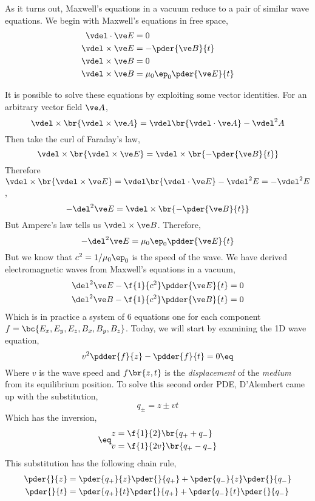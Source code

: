 \documentclass{article}
\begin{document}
As it turns out, Maxwell's equations in a vacuum reduce to a pair of similar wave equations. We begin with Maxwell's equations in free space,
\begin{align*}
    \vdel \cdot \ve E &= 0 \\
    \vdel \times \ve E &= -\pder{\ve B}{t} \\
    \vdel \times \ve B &= 0 \\
    \vdel \times \ve B &= \mu_0 \ep_0 \pder{\ve E}{t}
\end{align*}

It is possible to solve these equations by exploiting some vector identities. For an arbitrary vector field $\ve A$,
\[  \vdel \times \br{\vdel \times \ve A} = \vdel \br{\vdel \cdot \ve A} - \vdel^2 A \]
Then take the curl of Faraday's law,
\[ \vdel \times \br{\vdel \times \ve E} = \vdel \times \br{-\pder{\ve B}{t}} \]
Therefore $\vdel \times \br{\vdel \times \ve E} = \vdel \br{\vdel \cdot \ve E} - \vdel^2 E = - \vdel^2 E$,
\[  - \del^2 \ve E = \vdel \times \br{-\pder{\ve B}{t}} \]
But Ampere's law tells us $\vdel \times \ve B$. Therefore,
\[  - \del^2 \ve E = \mu_0 \ep_0 \pdder{\ve E}{t} \]
But we know that $c^2 = 1/\mu_0 \ep_0$ is the speed of the wave. We have derived electromagnetic waves from Maxwell's equations in a vacuum,
\begin{align*}
\del^2 \ve E - \f{1}{c^2} \pdder{\ve E}{t} &= 0 \\
\del^2 \ve B - \f{1}{c^2} \pdder{\ve B}{t} &= 0
\end{align*}
Which is in practice a system of $6$ equations one for each component $f = \bc{E_x, E_y, E_z, B_x, B_y, B_z}$. Today, we will start by examining the 1D wave equation,
\[ v^2 \pdder{f}{z} - \pdder{f}{t} = 0 \eq \label{eq:1d_Wave}\]
Where $v$ is the wave speed and $f\br{z,t}$ is the \textit{displacement} of the \textit{medium} from its equilibrium position. To solve this second order PDE, D'Alembert came up with the substitution,
\[ q_{\pm} = z \pm v t \]
Which has the inversion,
\begin{align*}
\eq \label{eq:dalembert_inversion}
\begin{split}
z &= \f{1}{2}\br{q_{+} + q_{-}} \\
v &= \f{1}{2v}\br{q_{+} - q_{-}}
\end{split}
\end{align*}
This substitution has the following chain rule,
\begin{align*}
    \pder{}{z} &= \pder{q_{+}}{z}\pder{}{q_{+}} + \pder{q_{-}}{z}\pder{}{q_{-}}\\
    \pder{}{t} &= \pder{q_{+}}{t}\pder{}{q_{+}} + \pder{q_{-}}{t}\pder{}{q_{-}}
\end{align*}
\end{document}
